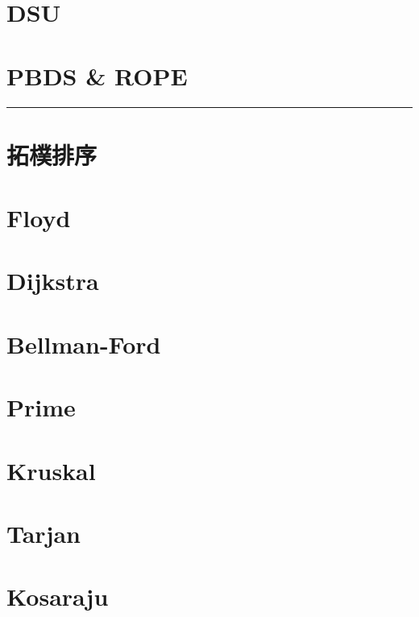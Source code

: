 \documentclass[a4paper]{article}
\begin{document}
\begin{CJK*}{UTF8}{bkai}
    \newpage
    \section{DSU}

    \newpage
    \section{PBDS \& ROPE}
    

    \hrule

    

    \newpage
    \section{拓樸排序}


    \newpage
    \section{Floyd}


    \newpage
    \section{Dijkstra}


    \newpage
    \section{Bellman-Ford}


    \newpage
    \section{Prime}


    \newpage
    \section{Kruskal}


    \newpage
    \section{Tarjan}

    \newpage
    \section{Kosaraju}
    

\end{CJK*}
\end{document}
